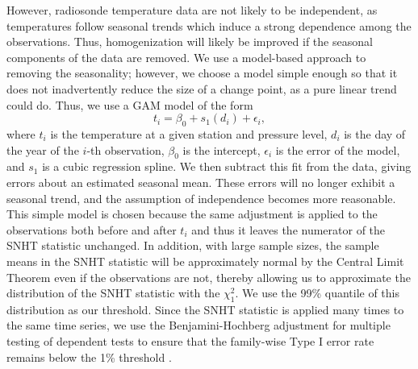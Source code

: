 \documentclass[12pt]{article}
\begin{document}
\begin{doublespacing}
However,  radiosonde temperature data are not likely to be independent, as temperatures follow seasonal trends which induce a strong dependence among the observations.  Thus, homogenization will likely be improved if the seasonal components of the data are removed.  We use a model-based approach to removing the seasonality; however, we  choose a model simple enough so that it does not inadvertently reduce the size of a change point, as a pure linear trend could do.  Thus, we use a GAM model of the form
\begin{equation}\label{eq:season}
t_i = \beta_0 + s_1(d_i) + \epsilon_i,
\end{equation}
where $t_i$ is the temperature at a given station and pressure level, $d_i$ is the day of the year of the $i$-th observation, $\beta_0$ is the intercept, $\epsilon_i$ is the error of the model, and $s_1$ is a cubic regression spline.   We then subtract this fit from the data, giving errors about an estimated seasonal mean.  These errors will no longer exhibit a seasonal trend, and the assumption of independence becomes more reasonable.  This simple model is chosen because the same adjustment is applied to the observations both before and after $t_i$ and thus it  leaves the numerator of the SNHT statistic unchanged.  In addition, with large sample sizes, the sample means in the SNHT statistic will be approximately normal by the Central Limit Theorem even if the observations are not, thereby allowing us to approximate the distribution of the SNHT statistic with the $\chi^2_1$.  We use the 99\% quantile of this distribution as our threshold.  Since the SNHT statistic is applied many times to the same time series,  we use the Benjamini-Hochberg adjustment for multiple testing of dependent tests to ensure that the family-wise Type I error rate remains below the 1\% threshold \cite{benjamini01}.


\end{doublespacing}
\end{document}

